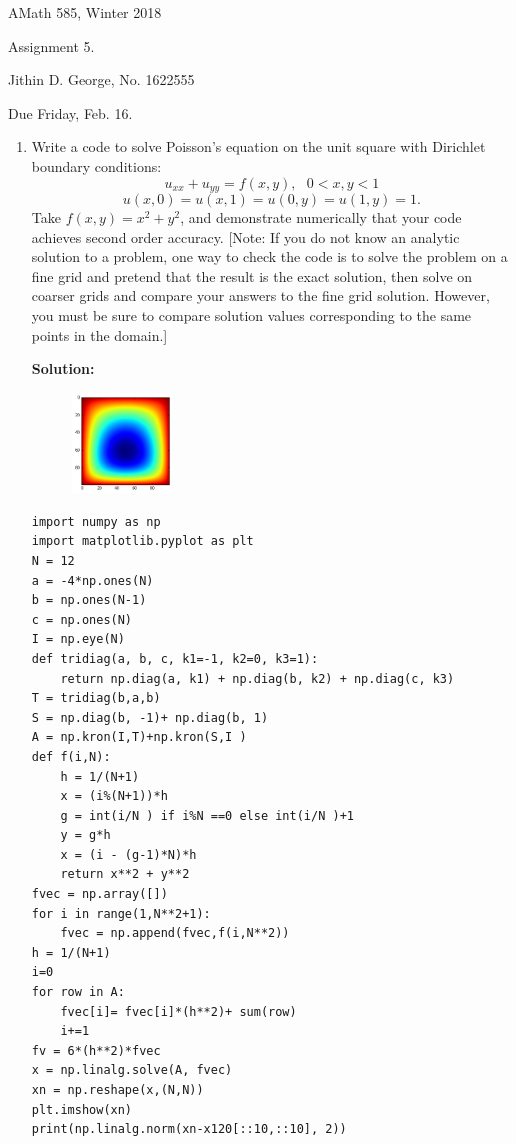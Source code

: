 \documentclass[letterpaper,12pt]{article}
\begin{document}




\noindent
{\scriptsize AMath 585, Winter 2018} \hfill 

\begin{center}
\large
Assignment 5.
\normalsize

Jithin D. George, No. 1622555
\end{center}

\noindent
Due Friday, Feb. 16.
\vspace{.3in}






\begin{enumerate}
\item
Write a code to solve Poisson's equation on the unit square with Dirichlet
boundary conditions:
\[
u_{xx} + u_{yy} = f(x,y) ,~~~0 < x,y < 1 
\]
\[
u(x,0) = u(x,1) = u(0,y) = u(1,y) = 1.
\]
Take $f(x,y) = x^2 + y^2$, and demonstrate numerically that your code 
achieves second order accuracy.  [Note:  If you do not know an analytic
solution to a problem, one way to check the code is to solve the problem
on a fine grid and pretend that the result is the exact solution, then
solve on coarser grids and compare your answers to the fine grid solution.
However, you must be sure to compare solution values corresponding to
the same points in the domain.]


{\bf Solution:}

\begin{figure}[H]

\centering
\includegraphics[width=0.25\textwidth]{plt5.png}



\end{figure}

	\begin{lstlisting}[style=myPythonstyle]
import numpy as np
import matplotlib.pyplot as plt
N = 12
a = -4*np.ones(N)
b = np.ones(N-1)
c = np.ones(N)
I = np.eye(N)
def tridiag(a, b, c, k1=-1, k2=0, k3=1):
    return np.diag(a, k1) + np.diag(b, k2) + np.diag(c, k3)
T = tridiag(b,a,b)
S = np.diag(b, -1)+ np.diag(b, 1)
A = np.kron(I,T)+np.kron(S,I )
def f(i,N):
    h = 1/(N+1) 
    x = (i%(N+1))*h
    g = int(i/N ) if i%N ==0 else int(i/N )+1
    y = g*h
    x = (i - (g-1)*N)*h
    return x**2 + y**2
fvec = np.array([])
for i in range(1,N**2+1):
    fvec = np.append(fvec,f(i,N**2))
h = 1/(N+1) 
i=0
for row in A:
    fvec[i]= fvec[i]*(h**2)+ sum(row)
    i+=1
fv = 6*(h**2)*fvec
x = np.linalg.solve(A, fvec)
xn = np.reshape(x,(N,N))
plt.imshow(xn)
print(np.linalg.norm(xn-x120[::10,::10], 2))


\end{lstlisting}
\end{enumerate}
\end{document}

